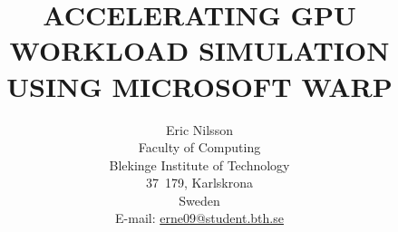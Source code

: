 \documentclass[a4paper,twocolumn,10pt]{article}
\begin{document}
\title{ACCELERATING GPU WORKLOAD SIMULATION USING MICROSOFT WARP} %
\author{Eric Nilsson\\
Faculty of Computing\\
Blekinge Institute of Technology\\
37~179, Karlskrona\\
Sweden\\
E-mail: \href{mailto:erne09@student.bth.se}{erne09@student.bth.se}}
\date{}

\maketitle

\thispagestyle{empty}





\newpage

\newpage


\newpage

\end{document}
